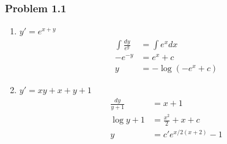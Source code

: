 \documentclass[10pt,a4paper]{book}
\theoremstyle{definition}
\begin{document}
\subsubsection{Problem 1.1}
\begin{enumerate}
    \item $y'=e^{x+y}$
    \begin{align}
        \int\frac{dy}{e^y}&=\int e^xdx\\
        -e^{-y}&=e^x+c\\
        y&=-\log\left(-e^x+c\right)
    \end{align}
    \item $y'=xy+x+y+1$
    \begin{align}
        \frac{dy}{y+1}&=x+1\\
        \log y+1&=\frac{x^2}{2}+x+c\\
        y&=c'e^{x/2(x+2)}-1
    \end{align}
\end{enumerate}
\end{document}

